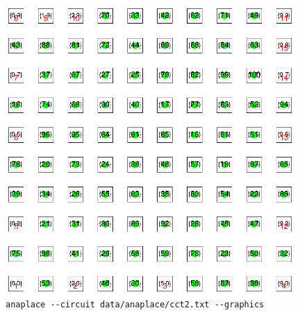 \documentclass[11pt]{article}
\begin{document}
\begin{figure}[H]
\centering
\includegraphics[clip, viewport=176 247 468 539, width=11cm]{assets/lab2/cct2-legalized.ps}
\cprotect\caption{\small\verb|anaplace --circuit data/anaplace/cct2.txt --graphics|}
\end{figure}
\end{document}
